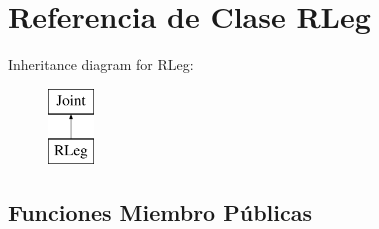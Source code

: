 \hypertarget{class_r_leg}{\section{\-Referencia de \-Clase \-R\-Leg}
\label{class_r_leg}
}
\-Inheritance diagram for \-R\-Leg\-:\begin{figure}[H]
\begin{center}
\leavevmode
\includegraphics[height=2.000000cm]{class_r_leg}
\end{center}
\end{figure}
\subsection*{\-Funciones \-Miembro \-Públicas}

